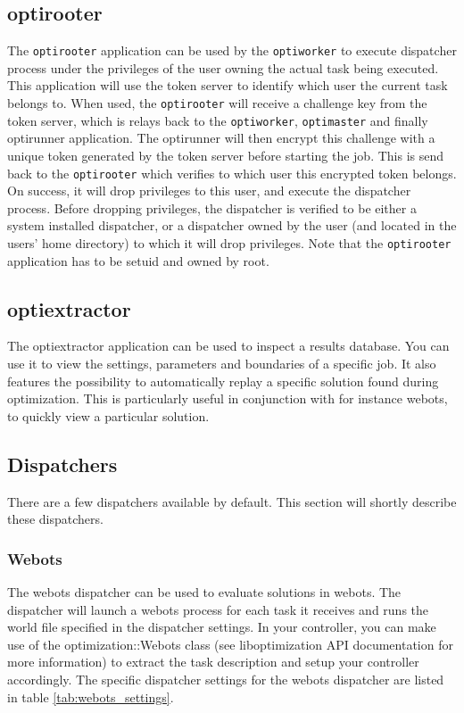 \documentclass{article}
\begin{document}
\subsection{optirooter}\label{app:optirooter}
The \verb!optirooter! application can be used by the \verb!optiworker! to execute dispatcher
process under the privileges of the user owning the actual task being executed.
This application will use the token server to identify which user the current
task belongs to. When used, the \verb!optirooter! will receive a challenge key from
the token server, which is relays back to the \verb!optiworker!, \verb!optimaster! and 
finally optirunner application. The optirunner will then encrypt this challenge
with a unique token generated by the token server before starting the job. This
is send back to the \verb!optirooter! which verifies to which user this encrypted
token belongs. On success, it will drop privileges to this user, and execute
the dispatcher process. Before dropping privileges, the dispatcher is
verified to be either a system installed dispatcher, or a dispatcher owned
by the user (and located in the users' home directory) to which it will
drop privileges. Note that the \verb!optirooter! application has to be setuid and
owned by root.

\subsection{optiextractor}\label{app:optiextractor}
The optiextractor application can be used to inspect a results database. You
can use it to view the settings, parameters and boundaries of a specific
job. It also features the possibility to automatically replay a specific
solution found during optimization. This is particularly useful in conjunction
with for instance webots, to quickly view a particular solution.

\subsection{Dispatchers}
There are a few dispatchers available by default. This section will shortly
describe these dispatchers.

\subsubsection{Webots}
The webots dispatcher can be used to evaluate solutions in webots. The
dispatcher will launch a webots process for each task it receives and runs
the world file specified in the dispatcher settings. In your controller, you
can make use of the optimization::Webots class (see liboptimization API
documentation for more information) to extract the task description and setup
your controller accordingly. The specific dispatcher settings for the webots
dispatcher are listed in table \ref{tab:webots_settings}.
\end{document}

